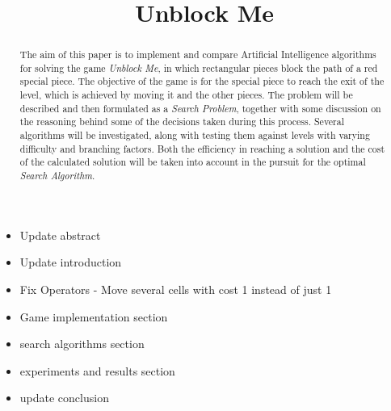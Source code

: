 \documentclass[conference]{IEEEtran}
\begin{document}
\title{Unblock Me}

\author{
\and
{}
\and
{}
}

\maketitle

\begin{itemize}
    \item Update abstract
    \item Update introduction
    \item Fix Operators - Move several cells with cost 1 instead of just 1
    \item Game implementation section
    \item search algorithms section
    \item experiments and results section
    \item update conclusion
\end{itemize}


\begin{abstract}
The aim of this paper is to implement and compare Artificial Intelligence algorithms for solving the game \textit{Unblock Me}, in which rectangular pieces block the path of a red special piece. The objective of the game is for the special piece to reach the exit of the level, which is achieved by moving it and the other pieces.
The problem will be described and then formulated as a \textit{Search Problem}, together with some discussion on the reasoning behind some of the decisions taken during this process.
Several algorithms will be investigated, along with testing them against levels with varying difficulty and branching factors. Both the efficiency in reaching a solution and the cost of the calculated solution will be taken into account in the pursuit for the optimal \textit{Search Algorithm}.
\end{abstract}
\end{document}
